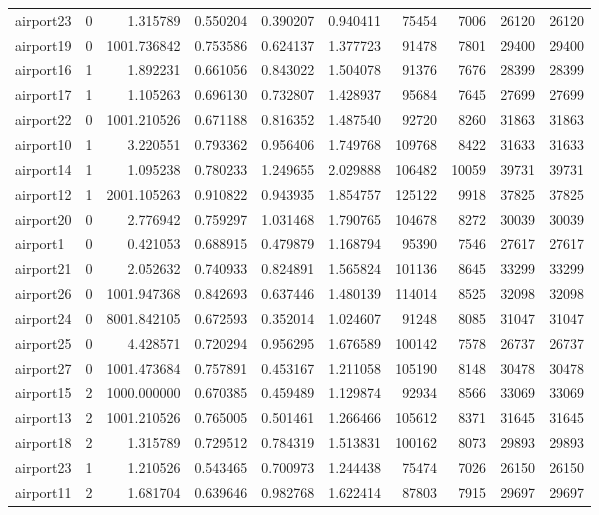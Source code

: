 \begin{longtable}{|l|r|r|r|r|r|r|r|r|r|}
airport23 & 0 & 1.315789 & 0.550204 & 0.390207 & 0.940411 & 75454 & 7006 & 26120 & 26120 \\
airport19 & 0 & 1001.736842 & 0.753586 & 0.624137 & 1.377723 & 91478 & 7801 & 29400 & 29400 \\
airport16 & 1 & 1.892231 & 0.661056 & 0.843022 & 1.504078 & 91376 & 7676 & 28399 & 28399 \\
airport17 & 1 & 1.105263 & 0.696130 & 0.732807 & 1.428937 & 95684 & 7645 & 27699 & 27699 \\
airport22 & 0 & 1001.210526 & 0.671188 & 0.816352 & 1.487540 & 92720 & 8260 & 31863 & 31863 \\
airport10 & 1 & 3.220551 & 0.793362 & 0.956406 & 1.749768 & 109768 & 8422 & 31633 & 31633 \\
airport14 & 1 & 1.095238 & 0.780233 & 1.249655 & 2.029888 & 106482 & 10059 & 39731 & 39731 \\
airport12 & 1 & 2001.105263 & 0.910822 & 0.943935 & 1.854757 & 125122 & 9918 & 37825 & 37825 \\
airport20 & 0 & 2.776942 & 0.759297 & 1.031468 & 1.790765 & 104678 & 8272 & 30039 & 30039 \\
airport1 & 0 & 0.421053 & 0.688915 & 0.479879 & 1.168794 & 95390 & 7546 & 27617 & 27617 \\
airport21 & 0 & 2.052632 & 0.740933 & 0.824891 & 1.565824 & 101136 & 8645 & 33299 & 33299 \\
airport26 & 0 & 1001.947368 & 0.842693 & 0.637446 & 1.480139 & 114014 & 8525 & 32098 & 32098 \\
airport24 & 0 & 8001.842105 & 0.672593 & 0.352014 & 1.024607 & 91248 & 8085 & 31047 & 31047 \\
airport25 & 0 & 4.428571 & 0.720294 & 0.956295 & 1.676589 & 100142 & 7578 & 26737 & 26737 \\
airport27 & 0 & 1001.473684 & 0.757891 & 0.453167 & 1.211058 & 105190 & 8148 & 30478 & 30478 \\
airport15 & 2 & 1000.000000 & 0.670385 & 0.459489 & 1.129874 & 92934 & 8566 & 33069 & 33069 \\
airport13 & 2 & 1001.210526 & 0.765005 & 0.501461 & 1.266466 & 105612 & 8371 & 31645 & 31645 \\
airport18 & 2 & 1.315789 & 0.729512 & 0.784319 & 1.513831 & 100162 & 8073 & 29893 & 29893 \\
airport23 & 1 & 1.210526 & 0.543465 & 0.700973 & 1.244438 & 75474 & 7026 & 26150 & 26150 \\
airport11 & 2 & 1.681704 & 0.639646 & 0.982768 & 1.622414 & 87803 & 7915 & 29697 & 29697 \\

\end{longtable}
